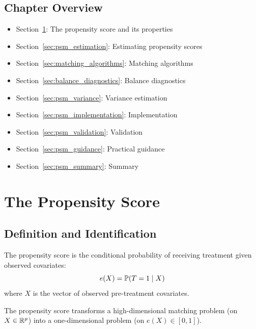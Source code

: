 \subsection{Chapter Overview}

\begin{itemize}
    \item Section~\ref{sec:propensity_score}: The propensity score and its properties
    \item Section~\ref{sec:psm_estimation}: Estimating propensity scores
    \item Section~\ref{sec:matching_algorithms}: Matching algorithms
    \item Section~\ref{sec:balance_diagnostics}: Balance diagnostics
    \item Section~\ref{sec:psm_variance}: Variance estimation
    \item Section~\ref{sec:psm_implementation}: Implementation
    \item Section~\ref{sec:psm_validation}: Validation
    \item Section~\ref{sec:psm_guidance}: Practical guidance
    \item Section~\ref{sec:psm_summary}: Summary
\end{itemize}


\section{The Propensity Score}
\label{sec:propensity_score}

\subsection{Definition and Identification}

\begin{definition}
\label{def:propensity_score}
The propensity score is the conditional probability of receiving treatment given observed covariates:
\begin{equation}
e(X) = \mathbb{P}(T = 1 \mid X)
\label{eq:propensity_def}
\end{equation}
where $X$ is the vector of observed pre-treatment covariates.
\end{definition}

The propensity score transforms a high-dimensional matching problem (on $X \in \mathbb{R}^p$) into a one-dimensional problem (on $e(X) \in [0,1]$).

